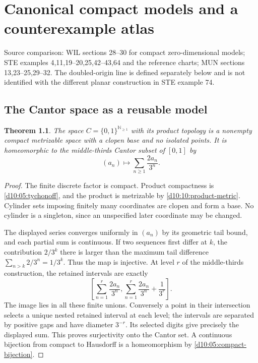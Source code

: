 \documentclass[11pt,oneside,openany]{book}
\newtheorem{theorem}{Theorem}[chapter]
\theoremstyle{definition}
\theoremstyle{remark}
\newcommand{\N}{\mathbb N}\newcommand{\Z}{\mathbb Z}\newcommand{\Q}{\mathbb Q}
\newcommand{\source}[1]{\par\begingroup\small\sffamily\color{black!65}Source comparison: #1\par\endgroup}
\begin{document}


\chapter{Canonical compact models and a counterexample atlas}
\label{ch:d10-18}
\source{WIL sections 28--30 for compact zero-dimensional models; STE examples 4,11,19--20,25,42--43,64 and the reference charts; MUN sections 13,23--25,29--32. The doubled-origin line is defined separately below and is not identified with the different planar construction in STE example 74.}

\section{The Cantor space as a reusable model}
\begin{theorem}\label{d10:18:cantor-model}
The space $C=\{0,1\}^{\N_{\geq1}}$ with its product topology is a nonempty
compact metrizable space with a clopen base and no isolated points.
It is homeomorphic to the middle-thirds Cantor subset of $[0,1]$ by
\[
 (a_n)\longmapsto \sum_{n\geq1}\frac{2a_n}{3^n}.
\]
\end{theorem}
\begin{proof}
The finite discrete factor is compact. Product compactness is
\cref{d10:05:tychonoff}, and the product is metrizable by
\cref{d10:10:product-metric}. Cylinder sets imposing finitely many
coordinates are clopen and form a base. No cylinder is a singleton,
since an unspecified later coordinate may be changed.

The displayed series converges uniformly in $(a_n)$ by its geometric
tail bound, and each partial sum is continuous. If two sequences first
differ at $k$, the contribution $2/3^k$ there is larger than the maximum
tail difference $\sum_{n>k}2/3^n=1/3^k$. Thus the map is injective.
At level $r$ of the middle-thirds construction, the retained intervals
are exactly
\[
 \left[\sum_{n=1}^r\frac{2a_n}{3^n},
       \sum_{n=1}^r\frac{2a_n}{3^n}+\frac1{3^r}\right].
\]
The image lies in all these finite unions. Conversely a point in their
intersection selects a unique nested retained interval at each level;
the intervals are separated by positive gaps and have diameter $3^{-r}$.
Its selected digits give precisely the displayed sum. This proves
surjectivity onto the Cantor set. A continuous bijection from compact
to Hausdorff is a homeomorphism by \cref{d10:05:compact-bijection}.
\end{proof}
\end{document}
